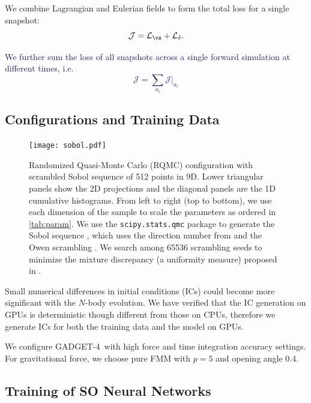 \documentclass[modern, trackchanges, dvipsnames]{aastex631}
\newcommand{\GADGET}{{{\fontsize{10pt}{12pt}\selectfont GADGET}-4}}
\newcommand{\cJ}{\mathcal{J}}
\newcommand{\cL}{\mathcal{L}}
\newcommand{\YZ}[1]{\textcolor{MidnightBlue}{#1}}
\begin{document}
We combine Lagrangian and Eulerian fields to form the total loss for a single
snapshot:
%
\begin{equation}
\cJ = \cL_\vs + \cL_\delta.
\end{equation}
%

\YZ{We further sum the loss of all snapshots across a single forward simulation
at different times, i.e.
\begin{equation}
\cJ = \sum_{a_i} \cJ |_{a_i}
\end{equation}
}


\vspace{1em}
\subsection{Configurations and Training Data}

\begin{figure}
  \centering
  \texttt{[image: sobol.pdf]}
  \caption{Randomized Quasi-Monte Carlo (RQMC) configuration with
    scrambled Sobol sequence of 512 points in 9D.
    Lower triangular panels show the 2D projections and the diagonal
    panels are the 1D cumulative histograms.
    From left to right (top to bottom), we use each dimension of the
    sample to scale the parameters as ordered in \autoref{tab:param}.
    We use the \texttt{scipy.stats.qmc} package \citep{SciPy} to
    generate the Sobol sequence \citep{Sobol1967}, which uses the
    direction number from \citet{JoeKuo2008} and the Owen scrambling
    \citep{Owen1998}.
    We search among 65536 scrambling seeds to minimize the mixture
    discrepancy (a uniformity measure) proposed in \citet{Zhou2013MD}.
  }
  \label{fig:sobol}
\end{figure}

Small numerical differences in initial conditions (ICs) could become more
significant with the $N$-body evolution.
We have verified that the IC generation on GPUs is deterministic though
different from those on CPUs, therefore we generate ICs for both the training
data and the model on GPUs.

We configure \GADGET\ with high force and time integration accuracy
settings.
For gravitational force, we choose pure FMM with $p=5$ and opening angle
0.4.


\vspace{1em}
\subsection{Training of SO Neural Networks}
\end{document}

